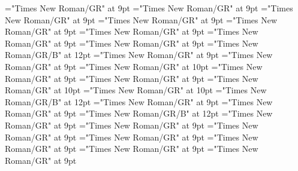 \documentclass[gps1,twoside]{article}
\begin{document}
\font\spanspannameslotslotsmorphosyntaxanalysismorphosyntaxanalysescomplexformsnotsubentrycomplexformsnotsubentriesentrybefore="Times New Roman/GR" at 9pt
\font\spannameslotslotsmorphosyntaxanalysismorphosyntaxanalysescomplexformsnotsubentrycomplexformsnotsubentriesentrylastchildafter="Times New Roman/GR" at 9pt
\font\spanspanowningentrysummarydefinitioncomplexformsnotsubentrycomplexformsnotsubentriesentrybefore="Times New Roman/GR" at 9pt
\font\spanowningentrysummarydefinitioncomplexformsnotsubentrycomplexformsnotsubentriesentryfirstchildbefore="Times New Roman/GR" at 9pt
\font\spanowningentrysummarydefinitioncomplexformsnotsubentrycomplexformsnotsubentriesentrylastchildafter="Times New Roman/GR" at 9pt
\font\nontrivialentryrootnontrivialentryrootnontrivialentryrootscomplexformsnotsubentrycomplexformsnotsubentriesentrybefore="Times New Roman/GR" at 9pt
\font\nontrivialentryrootscomplexformsnotsubentrycomplexformsnotsubentriesentrybefore="Times New Roman/GR" at 9pt
\font\nontrivialentryrootscomplexformsnotsubentrycomplexformsnotsubentriesentryafter="Times New Roman/GR" at 9pt
\font\nontrivialentryrootnontrivialentryrootscomplexformsnotsubentrycomplexformsnotsubentriesentry="Times New Roman/GR/B" at 12pt
\font\spanspanpicturesentrybefore="Times New Roman/GR" at 9pt
\font\picturesentryafter="Times New Roman/GR" at 9pt
\font\picturepicturesentry="Times New Roman/GR" at 10pt
\font\picturepicturesentryafter="Times New Roman/GR" at 9pt
\font\spanspancaptionpicturepicturesentrybefore="Times New Roman/GR" at 9pt
\font\paracontinuationsubentriesentry="Times New Roman/GR" at 10pt
\font\subentrysubentriesentry="Times New Roman/GR" at 10pt
\font\spanbzhheadwordsubentrysubentriesentry="Times New Roman/GR/B" at 12pt
\font\spanspanheadwordsubentrysubentriesentrybefore="Times New Roman/GR" at 9pt
\font\spanheadwordsubentrysubentriesentrylastchildafter="Times New Roman/GR" at 9pt
\font\spanheadwordsubentrysubentriesentry="Times New Roman/GR/B" at 12pt
\font\complexformtypessubentrysubentriesentryafter="Times New Roman/GR" at 9pt
\font\spanspanreverseabbrcomplexformtypecomplexformtypessubentrysubentriesentrybefore="Times New Roman/GR" at 9pt
\font\pronunciationpronunciationpronunciationssubentrysubentriesentrybefore="Times New Roman/GR" at 9pt
\font\pronunciationssubentrysubentriesentryafter="Times New Roman/GR" at 9pt
\font\spanspanformpronunciationpronunciationssubentrysubentriesentrybefore="Times New Roman/GR" at 9pt
\font\spanformpronunciationpronunciationssubentrysubentriesentryfirstchildbefore="Times New Roman/GR" at 9pt
\font\spanformpronunciationpronunciationssubentrysubentriesentrylastchildafter="Times New Roman/GR" at 9pt
\end{document}
